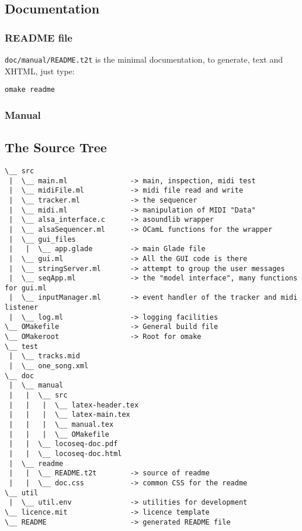 \subsection{Documentation}

\subsubsection{README file}

\texttt{doc/manual/README.t2t} is the minimal documentation, to
generate, text and XHTML, just type:

\begin{verbatim}
omake readme
\end{verbatim}

\subsubsection{Manual}



\subsection{The Source Tree}
\begin{verbatim}
\__ src                                        
 |  \__ main.ml               -> main, inspection, midi test
 |  \__ midiFile.ml           -> midi file read and write
 |  \__ tracker.ml            -> the sequencer
 |  \__ midi.ml               -> manipulation of MIDI "Data"
 |  \__ alsa_interface.c      -> asoundlib wrapper
 |  \__ alsaSequencer.ml      -> OCamL functions for the wrapper
 |  \__ gui_files                   
 |   |  \__ app.glade         -> main Glade file
 |  \__ gui.ml                -> All the GUI code is there
 |  \__ stringServer.ml       -> attempt to group the user messages
 |  \__ seqApp.ml             -> the "model interface", many functions for gui.ml 
 |  \__ inputManager.ml       -> event handler of the tracker and midi listener
 |  \__ log.ml                -> logging facilities
\__ OMakefile                 -> General build file
\__ OMakeroot                 -> Root for omake
\__ test                                       
 |  \__ tracks.mid  
 |  \__ one_song.xml                             
\__ doc
 |  \__ manual
 |   |  \__ src
 |   |   |  \__ latex-header.tex
 |   |   |  \__ latex-main.tex
 |   |   |  \__ manual.tex
 |   |   |  \__ OMakefile
 |   |  \__ locoseq-doc.pdf
 |   |  \__ locoseq-doc.html
 |  \__ readme
 |   |  \__ README.t2t        -> source of readme
 |   |  \__ doc.css           -> common CSS for the readme 
\__ util                      
 |  \__ util.env              -> utilities for development
\__ licence.mit               -> licence template
\__ README                    -> generated README file
\end{verbatim}


